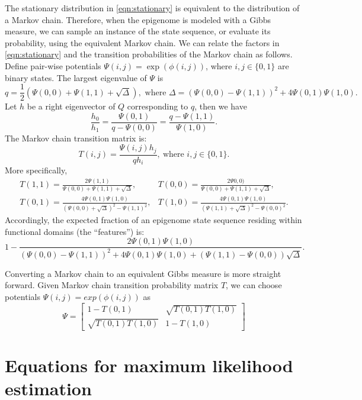 \documentclass[11pt]{article}
\begin{document}
The stationary distribution in \eqref{eqn:stationary} is equivalent to
the distribution of a Markov chain. Therefore, when the epigenome is
modeled with a Gibbs measure, we can sample an instance of the state
sequence, or evaluate its probability, using the equivalent Markov
chain. We can relate the factors in \eqref{eqn:stationary} and the
transition probabilities of the Markov chain as follows. Define
pair-wise potentials $\Psi(i,j)=\exp(\phi(i, j))$, where $i, j\in\{0,1\}$
are binary states. The largest eigenvalue of $\Psi$ is
\[
q=\textstyle\frac{1}{2}\left(\Psi(0,0)+\Psi(1,1) +\sqrt{\Delta}\right), \text{ where }
\Delta=(\Psi(0,0) - \Psi(1,1))^2 + 4\Psi(0,1)\Psi(1,0).
\]
Let $h$ be a right eigenvector of $Q$ corresponding to $q$, then we have
\[
\frac{h_0}{h_1} = \frac{\Psi(0,1)}{q-\Psi(0,0)} = \frac{q-\Psi(1,1)}{\Psi(1,0)}.
\]
The Markov chain transition matrix is:
\[
T(i,j) = \frac{\Psi(i,j)h_j}{qh_{i}},~\text{where } i,j \in\{0,1\}.
\]
More specifically,
\begin{equation} \label{eqn:gibbs2markov}
  \begin{array}{ll}
    T(1,1) = \displaystyle\frac{2\Psi(1,1)}{\Psi(0,0)+\Psi(1,1)+\sqrt{\Delta}}, &
    T(0,0) = \displaystyle\frac{2\Psi0,0)}{\Psi(0,0)+\Psi(1,1)+\sqrt{\Delta}}, \\[2em]
    T(0,1) = \displaystyle\frac{4\Psi(0,1)\Psi(1,0)}{(\Psi(0,0)+\sqrt{\Delta})^2 -\Psi(1,1)^2}, &
    T(1,0) = \displaystyle\frac{4\Psi(0,1)\Psi(1,0)}{(\Psi(1,1)+\sqrt{\Delta})^2 -\Psi(0,0)^2}.
  \end{array}
\end{equation}
Accordingly, the expected fraction of an epigenome state sequence
residing within functional domains (the ``features'') is:
\[
1- \frac{2\Psi(0,1)\Psi(1,0)}{(\Psi(0,0)-\Psi(1,1))^2 + 4\Psi(0,1)\Psi(1,0) +
  (\Psi(1,1)-\Psi(0,0))\sqrt{\Delta}}.
\]


Converting a Markov chain to an equivalent Gibbs measure is more
straight forward. Given Markov chain transition probability matrix
$T$, we can choose potentials $\Psi(i,j) = exp(\phi(i,j))$ as 
\[
\Psi =
 \begin{bmatrix}
   1 - T(0,1) & \sqrt{T(0,1)T(1,0)} \\
    \sqrt{T(0,1)T(1,0)} & 1-T(1,0)
 \end{bmatrix}
\]

\section{Equations for maximum likelihood estimation}
\end{document}
